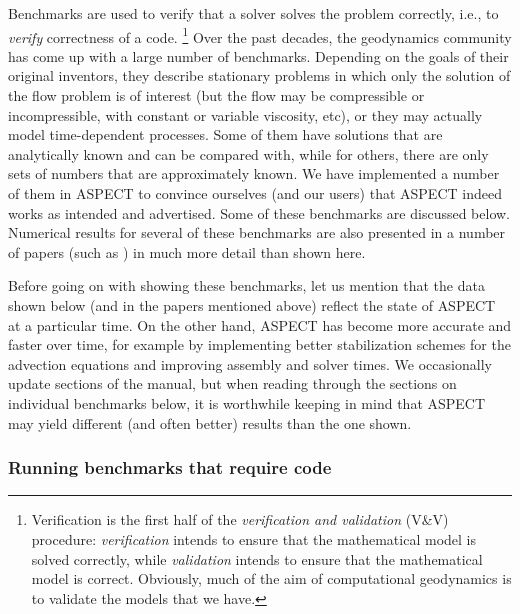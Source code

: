 \documentclass{article}
\newcommand{\aspect}{\textsc{ASPECT}}
\begin{document}
Benchmarks are used to verify that a solver solves the problem correctly,
i.e., to \textit{verify} correctness of a code.%
\footnote{Verification is the first half of the \textit{verification and
    validation} (V\&V) procedure: \textit{verification} intends to ensure that the
  mathematical model is solved correctly, while \textit{validation} intends to
  ensure that the mathematical model is correct. Obviously, much of the aim of
  computational geodynamics is to validate the models that we have.}
Over the past decades, the geodynamics community has come up with a large
number of benchmarks. Depending on the goals of their original inventors, they
describe stationary problems in which only the solution of the flow problem is
of interest (but the flow may be compressible or incompressible, with constant
or variable viscosity, etc), or they may actually model time-dependent
processes. Some of them have solutions that are analytically known and can be
compared with, while for others, there are only sets of numbers that are
approximately known. We have implemented a number of them in \aspect{} to
convince ourselves (and our users) that \aspect{} indeed works as intended and
advertised. Some of these benchmarks are discussed below. Numerical results
for several of these benchmarks are also presented in a number of
papers (such as \cite{KHB12,heister_aspect_methods2,T15,FBTGS18}) in much more
detail than shown here.

Before going on with showing these benchmarks, let us mention that the
data shown below (and in the papers mentioned above) reflect the state
of \aspect{} at a particular time. On the other hand, \aspect{} has
become more accurate and faster over time, for example by implementing
better stabilization schemes for the advection equations and improving
assembly and solver times. We occasionally update sections of the
manual, but when reading through the sections on individual benchmarks
below, it is worthwhile keeping in mind that \aspect{} may yield
different (and often better) results than the one shown.


\subsubsection{Running benchmarks that require code}
\label{sec:benchmark-run}
\end{document}
